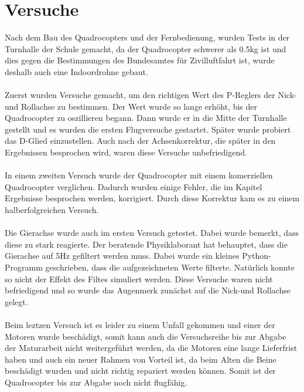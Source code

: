 \documentclass[12pt,a4paper, ngerman]{article}
\begin{document}
\section{Versuche}
Nach dem Bau des Quadrocopters und der Fernbedienung, wurden Tests in der Turnhalle der Schule gemacht, da der Quadrocopter schwerer als 0.5kg ist und dies gegen die Bestimmungen des Bundesamtes für Zivilluftfahrt ist\cite{website:BAZL}, wurde deshalb auch eine Indoordrohne gebaut. \\ \\ Zuerst wurden Versuche gemacht, um den richtigen Wert des P-Reglers der Nick-und Rollachse zu bestimmen. Der Wert wurde so lange erhöht, bis der Quadrocopter zu oszillieren begann. Dann wurde er in die Mitte der Turnhalle gestellt und es wurden die ersten Flugversuche gestartet. Später wurde probiert das D-Glied einzustellen. Auch nach der Achsenkorrektur, die später in den Ergebnissen besprochen wird, waren diese Versuche unbefriedigend. \\ \\ In einem zweiten Versuch wurde der Quadrocopter mit einem komerziellen Quadrocopter verglichen. Dadurch wurden einige Fehler, die im Kapitel 
Ergebnisse besprochen werden, korrigiert. Durch diese Korrektur kam es zu einem halberfolgreichen Versuch. \\ \\ Die Gierachse wurde auch im ersten Versuch getestet. Dabei wurde bemerkt, dass diese zu stark reagierte. Der beratende Physiklaborant hat behauptet, dass die Gierachse auf 5Hz gefiltert werden muss. Dabei wurde ein kleines Python-Programm geschrieben, dass die aufgezeichneten Werte filterte. Natürlich konnte so nicht der Effekt des Filtes simuliert werden. Diese Versuche waren nicht befriedigend und so wurde das Augenmerk zunächst auf die Nick-und Rollachse gelegt. \\ \\ Beim leztzen Versuch ist es leider zu einem Unfall gekommen und einer der Motoren wurde beschädigt, somit kann auch die Versuchsreihe bis zur Abgabe der Maturarbeit nicht weitergeführt werden, da die Motoren eine lange Lieferfrist haben und auch ein neuer Rahmen von Vorteil ist, da beim Alten die Beine beschädigt wurden und nicht richtig repariert werden können. Somit ist der Quadrocopter bis zur Abgabe noch nicht flugfähig. 
\newpage
\end{document}
